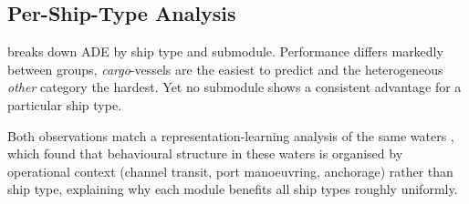 \documentclass[runningheads]{preamp/llncs}
\begin{document}


\subsection{Per-Ship-Type Analysis}

 breaks down \ac{ADE} by ship type and submodule.
Performance differs markedly between groups,
\textit{cargo}-vessels are the easiest to predict
and the heterogeneous \textit{other} category the hardest.%
%
Yet no submodule shows a consistent advantage for a particular ship type.
%

Both observations match a representation-learning analysis of the same waters \cite{al2026representation},
which found that behavioural structure in these waters is organised by operational context
(channel transit, port manoeuvring, anchorage) rather than ship type,
explaining why each module benefits all ship types roughly uniformly.
\end{document}
